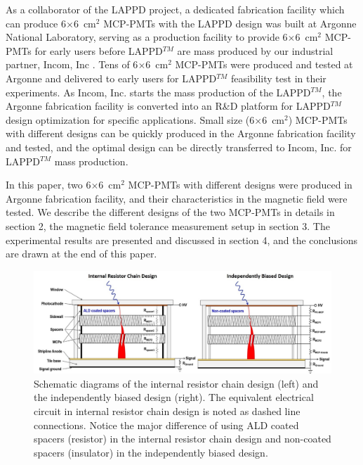 \documentclass[preprint,5p]{elsarticle}
\begin{document}
As a collaborator of the LAPPD project, a dedicated fabrication facility 
\cite{15} which can produce 6$\times$6~cm$^2$ MCP-PMTs with the LAPPD design was 
built at Argonne National Laboratory, serving as a production facility to 
provide 6$\times$6~cm$^2$ MCP-PMTs for early users before LAPPD$^{TM}$ are mass 
produced by our industrial partner, Incom, Inc \cite{16}. Tens of 
6$\times$6~cm$^2$ MCP-PMTs were produced and tested at Argonne and delivered to early 
users for LAPPD$^{TM}$ feasibility test in their experiments. As Incom, Inc.  
starts the mass production of the LAPPD$^{TM}$, the Argonne fabrication 
facility is converted into an R\&D platform for LAPPD$^{TM}$ design 
optimization for specific applications. Small size (6$\times$6~cm$^2$) MCP-PMTs 
with different designs can be quickly produced in the Argonne fabrication 
facility and tested, and the optimal design can be directly transferred to 
Incom, Inc. for LAPPD$^{TM}$ mass production. 

In this paper, two 6$\times$6~cm$^2$ MCP-PMTs with different designs were 
produced in Argonne fabrication facility, and their characteristics in the 
magnetic field were tested. We describe the different designs of the two 
MCP-PMTs in details in section 2, the magnetic field tolerance measurement 
setup in section 3. The experimental results are presented and discussed in 
section 4, and the conclusions are drawn at the end of this paper.



\begin{figure}[tbp]
\centering \includegraphics[scale=1.1]{fig/Figure1.jpg}
\caption{Schematic diagrams of the internal resistor chain design (left) and 
   the independently biased design (right). The equivalent electrical circuit 
   in internal resistor chain design is noted as dashed line connections.  
   Notice the major difference of using ALD coated spacers (resistor) in the 
   internal resistor chain design and non-coated spacers (insulator) in the
   independently biased design.} \label{fig:design}
\end{figure}
\end{document}
